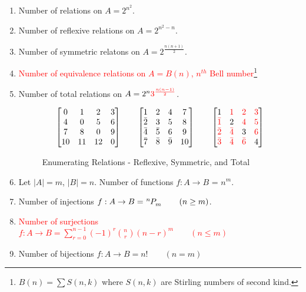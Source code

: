 \begin{enumerate}
	\item Number of relations on $A = 2^{n^2}$.
	\item Number of reflexive relations on $A = 2^{n^2-n}$.
	\item Number of symmetric relatons on $A = 2^{\frac{n(n+1)}{2}}$.
	\item \textcolor{red}{Number of equivalence relations on $A = B(n)$, $n^{th}$ Bell number\footnote{$B(n)= \sum S(n,k)$ where $S(n,k)$ are Stirling numbers of second kind.}}
	\item Number of total relations on $A = 2^n \textcolor{red}{3^{\frac{n(n-1)}{2}}}$.
	\begin{figure}[hbt]
	\centering
		\[ \begin{bmatrix} 0 & 1 & 2 & 3 \\ 4 & 0 & 5 & 6 \\ 7 & 8 & 0 & 9 \\ 10 & 11 & 12 & 0 \end{bmatrix} \qquad \begin{bmatrix} 1 & 2 & 4 & 7 \\ \bar{2} & 3 & 5 & 8 \\ \bar{4} & \bar{5} & 6 & 9 \\ \bar{7} & \bar{8} & \bar{9} & 10 \end{bmatrix} \qquad \begin{bmatrix} 1 & \textcolor{red}{1} & \textcolor{red}{2} & \textcolor{red}{3} \\ \textcolor{red}{\bar{1}} & 2 & \textcolor{red}{4} & \textcolor{red}{5} \\ \textcolor{red}{\bar{2}} & \textcolor{red}{\bar{4}} & 3 & \textcolor{red}{6} \\ \textcolor{red}{\bar{3}} & \textcolor{red}{\bar{4}} & \textcolor{red}{\bar{6}} & 4 \end{bmatrix} \]
	\caption{Enumerating Relations - Reflexive, Symmetric, and Total}
	\end{figure}
	\item Let $|A|=m$, $|B|=n$. Number of functions $f : A \to B $ = $n^m$.
	\item Number of injections $f : A \to B = \perms{n}{m} \qquad (n \geq m)$.
	\item \textcolor{red}{Number of surjections $\displaystyle f : A \to B = \sum_{r=0}^{n-1} (-1)^r \binom{n}{r} (n-r)^m \qquad (n \leq m)$}
	\item Number of bijections $f : A \to B = n! \qquad (n = m)$
	\begin{figure}[hbt]

\end{figure}
\end{enumerate}
